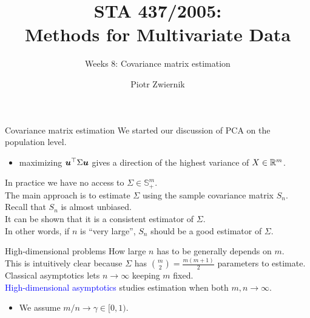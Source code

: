 \documentclass[11pt,handout,aspectratio=169]{beamer}
\title[STA437-Week1]{STA 437/2005: \\ Methods for Multivariate Data}
\subtitle[]{Weeks 8: Covariance matrix estimation}
\author[Piotr Zwiernik]{Piotr Zwiernik}
\institute[UofT]{University of Toronto}
\date{}
\begin{document}
\maketitle

\begin{frame}{Covariance matrix estimation}
	We started our discussion of PCA on the population level. 
	\begin{itemize}
		\item maximizing $\boldsymbol u^\top \Sigma \boldsymbol u$ gives a direction of the highest variance of $X\in \mathbb R^m$. \\[5mm]
	\end{itemize}
	
	In practice we have no access to $\Sigma\in \mathbb S^m_+$.\\[5mm]
	
	The main approach is to estimate $\Sigma$ using the sample covariance matrix $S_n$.\\[5mm]
	
	Recall that $S_n$ is almost unbiased.\\[5mm] 
	It can be shown that it is a consistent estimator of $\Sigma$.\\[5mm]
	In other words, if $n$ is ``very large'', $S_n$ should be a good estimator of $\Sigma$.  
\end{frame}

\begin{frame}{High-dimensional problems}
	How large $n$ has to be generally depends on $m$.\\[5mm]
	This is intuitively clear because $\Sigma$ has $\binom{m}{2}=\tfrac{m(m+1)}{2}$ parameters to estimate.\\[5mm]
\alert{Classical asymptotics} lets $n\to \infty$ keeping $m$ fixed. \\[5mm]
\textcolor{blue}{High-dimensional asymptotics} studies estimation when both $m,n\to \infty$.\begin{itemize}
	\item We assume $m/n\to \gamma\in [0,1)$.
\end{itemize}\end{frame}
\end{document}
